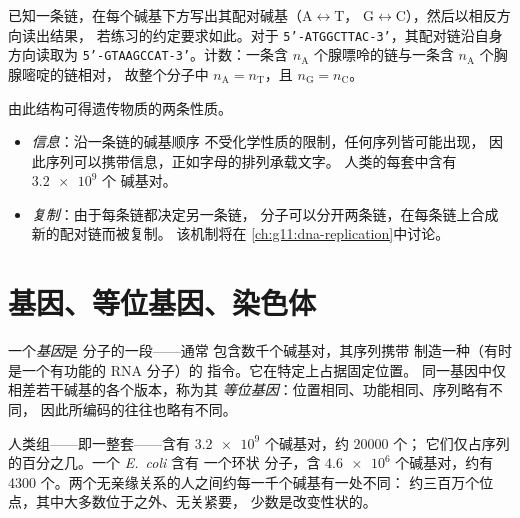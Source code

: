 \begin{method}[写出互补链]\label{met:g10:universal-dna:complement}
已知一条链，在每个碱基下方写出其配对碱基（A$\leftrightarrow$T，
G$\leftrightarrow$C），然后以相反方向读出结果，
若练习的约定要求如此。对于
\texttt{5'-ATGGCTTAC-3'}，其配对链沿自身方向读取为
\texttt{5'-GTAAGCCAT-3'}。计数：一条含
$n_\mathrm{A}$ 个腺嘌呤的链与一条含 $n_\mathrm{A}$ 个胸腺嘧啶的链相对，
故整个分子中 $n_\mathrm{A} = n_\mathrm{T}$，且
$n_\mathrm{G} = n_\mathrm{C}$。
\end{method}

\begin{proposition}[结构所解释的内容]\label{prop:g10:universal-dna:explains}
由此结构可得遗传物质的两条性质。
 \begin{itemize}
  \item \emph{信息}：沿一条链的碱基顺序
        不受化学性质的限制，任何序列皆可能出现，
        因此序列可以携带信息，正如字母的排列承载文字。
        人类的每套中含有 $\num{3.2e9}$ 个
        碱基对。
  \item \emph{复制}：由于每条链都决定另一条链，
        分子可以分开两条链，在每条链上合成新的配对链而被复制。
        该机制将在
        \cref{ch:g11:dna-replication}中讨论。
\end{itemize}
\end{proposition}
\admitted

\section{基因、等位基因、染色体}

\begin{definition}[基因与等位基因]\label{def:g10:universal-dna:gene}
一个\emph{基因}是  分子的一段——通常
包含数千个碱基对，其序列携带
制造一种（有时是一个有功能的 RNA 分子）的
指令。它在特定上占据固定位置。
同一基因中仅相差若干碱基的各个版本，称为其
\emph{等位基因}：位置相同、功能相同、序列略有不同，
因此所编码的往往也略有不同。
\end{definition}

\begin{example}[数字举例]\label{ex:g10:universal-dna:numbers}
人类组——即一整套——含有
$\num{3.2e9}$ 个碱基对，约 $\num{20000}$ 个；
它们仅占序列的百分之几。一个 \emph{E.~coli} 含有
一个环状  分子，含 $\num{4.6e6}$ 个碱基对，约有 4300
个。两个无亲缘关系的人之间约每一千个碱基有一处不同：
约三百万个位点，其中大多数位于之外、无关紧要，
少数是改变性状的。
\end{example}

